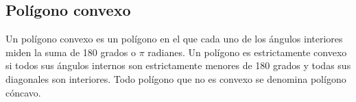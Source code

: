 \subsection{Polígono convexo}
Un polígono convexo es un polígono en el que cada uno de los ángulos interiores miden la suma de 180 grados o $\pi$ radianes. Un polígono es estrictamente convexo si todos sus ángulos internos son estrictamente menores de 180 grados y todas sus diagonales son interiores. Todo polígono que no es convexo se denomina polígono cóncavo. 